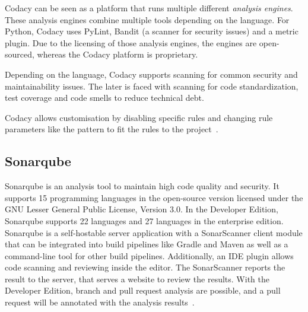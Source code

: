Codacy can be seen as a platform that runs multiple different \textit{analysis engines}. These analysis engines combine multiple tools depending on the language. For Python, Codacy uses  PyLint, Bandit (a scanner for security issues) and a metric plugin.
Due to the licensing of those analysis engines, the engines are open-sourced, whereas the Codacy platform is proprietary.

Depending on the language, Codacy supports scanning for common security and maintainability issues. The later is faced with scanning for code standardization, test coverage and code smells to reduce technical debt.

Codacy allows customisation by disabling specific rules and changing rule parameters like the pattern to fit the rules to the project~\cite{noauthor_codacy_nodate}. 

\subsection{Sonarqube}
Sonarqube is an analysis tool to maintain high code quality and security. It supports 15 programming languages in the open-source version licensed under the GNU Lesser General Public License, Version 3.0. In the Developer Edition, Sonarqube supports 22 languages and 27 languages in the enterprise edition. Sonarqube is a self-hostable server application with a SonarScanner client module that can be integrated into build pipelines like Gradle and Maven as well as a command-line tool for other build pipelines. Additionally, an IDE plugin allows code scanning and reviewing inside the editor. The SonarScanner reports the result to the server, that serves a website to review the results. With the Developer Edition, branch and pull request analysis are possible, and a pull request will be annotated with the analysis results~\cite{noauthor_code_nodate}.

